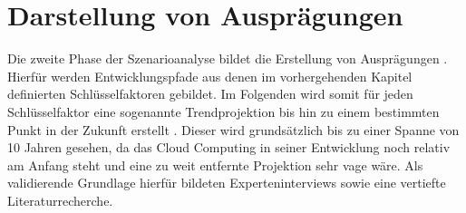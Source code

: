 \section{Darstellung von Ausprägungen}
\label{manifestations}

Die zweite Phase der Szenarioanalyse bildet die Erstellung von Ausprägungen \cite{spath}. Hierfür werden Entwicklungspfade aus denen im vorhergehenden Kapitel definierten Schlüsselfaktoren gebildet. Im Folgenden wird somit für jeden Schlüsselfaktor eine sogenannte Trendprojektion bis hin zu einem bestimmten Punkt in der Zukunft erstellt \cite{mietzner}. Dieser wird grundsätzlich bis zu einer Spanne von 10 Jahren gesehen, da das Cloud Computing in seiner Entwicklung noch relativ am Anfang steht und eine zu weit entfernte Projektion sehr vage wäre. Als validierende Grundlage hierfür bildeten Experteninterviews sowie eine vertiefte Literaturrecherche.